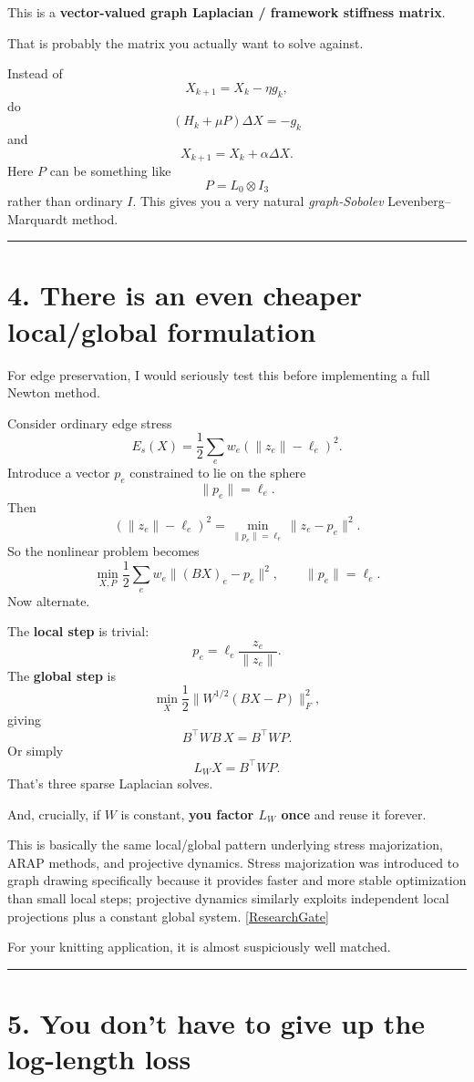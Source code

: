\documentclass[11pt]{article}
\begin{document}
This is a \textbf{vector-valued graph Laplacian / framework stiffness
matrix}.

That is probably the matrix you actually want to solve against.

Instead of
\[
X_{k+1}=X_k-\eta g_k,
\]
do
\[
\boxed{
(H_k+\mu P)\Delta X=-g_k
}
\]
and
\[
X_{k+1}=X_k+\alpha\Delta X.
\]
Here \(P\) can be something like
\[
P=L_0\otimes I_3
\]
rather than ordinary \(I\). This gives you a very natural
\emph{graph-Sobolev} Levenberg--Marquardt method.

\bigskip\hrule

\section*{4. There is an even cheaper local/global formulation}

For edge preservation, I would seriously test this before implementing a
full Newton method.

Consider ordinary edge stress
\[
E_s(X)
=
\frac12
\sum_e
w_e(\|z_e\|-\ell_e)^2.
\]
Introduce a vector \(p_e\) constrained to lie on the sphere
\[
\|p_e\|=\ell_e.
\]
Then
\[
\boxed{
(\|z_e\|-\ell_e)^2
=
\min_{\|p_e\|=\ell_e}
\|z_e-p_e\|^2.
}
\]
So the nonlinear problem becomes
\[
\min_{X,P}
\frac12
\sum_e
w_e\|(BX)_e-p_e\|^2,
\qquad
\|p_e\|=\ell_e.
\]
Now alternate.

The \textbf{local step} is trivial:
\[
p_e
=
\ell_e
\frac{z_e}{\|z_e\|}.
\]
The \textbf{global step} is
\[
\min_X
\frac12\|W^{1/2}(BX-P)\|_F^2,
\]
giving
\[
\boxed{
B^\top W B\,X
=
B^\top W P.
}
\]
Or simply
\[
\boxed{
L_W X=B^\top WP.
}
\]
That's three sparse Laplacian solves.

And, crucially, if \(W\) is constant, \textbf{you factor \(L_W\) once} and
reuse it forever.

This is basically the same local/global pattern underlying stress
majorization, ARAP methods, and projective dynamics. Stress majorization was
introduced to graph drawing specifically because it provides faster and
more stable optimization than small local steps; projective dynamics
similarly exploits independent local projections plus a constant global
system.
\href{https://www.researchgate.net/publication/30508817_Graph_Drawing_by_Stress_Majorization?utm_source=chatgpt.com}{[ResearchGate]}

For your knitting application, it is almost suspiciously well matched.

\bigskip\hrule

\section*{5. You don't have to give up the log-length loss}
\end{document}
